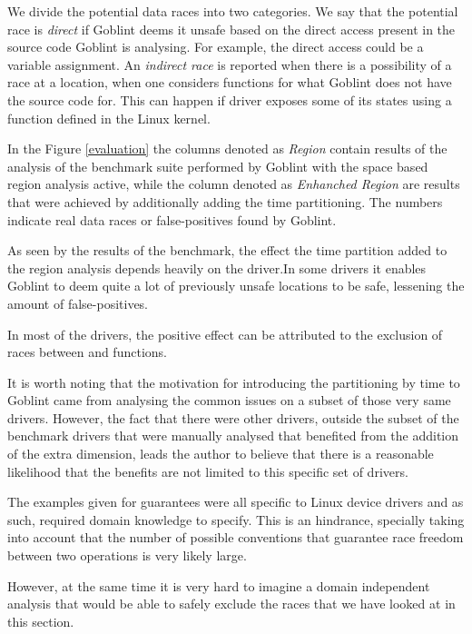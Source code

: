 \documentclass[..thesis.tex]{subfiles}
\begin{document}
We divide the potential data races into two categories. We say that the potential race is \textit{direct} if Goblint deems it unsafe based on the direct access present in the source code
Goblint is analysing. For example, the direct access could be a variable assignment.
An \textit{indirect race} is reported when there is a possibility of a race at a location, when one considers functions for what Goblint does not have the source code for.
This can happen if driver exposes some of its states using a function defined in the Linux kernel.   

In the Figure \ref{evaluation} the columns denoted as \textit{Region} contain results of the analysis of the benchmark suite performed by Goblint with the space based region analysis active, while the column denoted as \textit{Enhanched Region} are results that were achieved by additionally adding the time partitioning. The numbers indicate real data races or false-positives found by Goblint.

As seen by the results of the benchmark, the effect the time partition added to the region analysis depends heavily on the driver.In some drivers it enables Goblint to deem quite a lot of previously unsafe locations to be safe, lessening the amount of false-positives.

In most of the drivers, the positive effect can be attributed to the exclusion of races between  and  functions. 

It is worth noting that the motivation for introducing the partitioning by time to Goblint came from analysing the common issues on a subset of those very same drivers.
However, the fact that there were other drivers, outside the subset of the benchmark drivers that were manually analysed
that benefited from the addition of the extra dimension, leads the author to believe that there is a reasonable likelihood
that the benefits are not limited to this specific set of drivers.



The examples given for guarantees were all specific to Linux device drivers and as such, required domain knowledge to specify. This is an hindrance,
specially taking into account that the number of possible conventions that guarantee race freedom between two operations is very likely large.  

However, at the same time it is very hard to imagine a domain independent analysis that would be able to safely exclude the races that we have looked at in this section.
\end{document}
